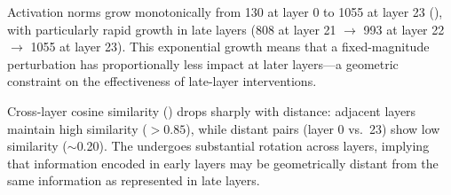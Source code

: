 Activation norms grow monotonically from 130 at layer 0 to 1055 at layer 23 (), with particularly rapid growth in late layers (808 at layer 21 $\to$ 993 at layer 22 $\to$ 1055 at layer 23). This exponential growth means that a fixed-magnitude perturbation has proportionally less impact at later layers---a geometric constraint on the effectiveness of late-layer interventions.

Cross-layer cosine similarity () drops sharply with distance: adjacent layers maintain high similarity ($>0.85$), while distant pairs (\eg layer 0 vs.\ 23) show low similarity ($\sim$0.20). The \residstream undergoes substantial rotation across layers, implying that information encoded in early layers may be geometrically distant from the same information as represented in late layers.
